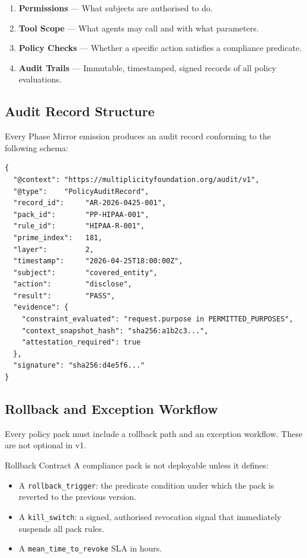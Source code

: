 \documentclass[12pt,letterpaper]{article}
\theoremstyle{definition}
\theoremstyle{plain}
\theoremstyle{remark}
\begin{document}
\begin{enumerate}
  \item \textbf{Permissions} --- What subjects are authorised to do.
  \item \textbf{Tool Scope} --- What agents may call and with what parameters.
  \item \textbf{Policy Checks} --- Whether a specific action satisfies a
  compliance predicate.
  \item \textbf{Audit Trails} --- Immutable, timestamped, signed records of all
  policy evaluations.
\end{enumerate}

\subsection{Audit Record Structure}

Every Phase Mirror emission produces an audit record conforming to the following
schema:

\begin{lstlisting}[style=jsonStyle, caption={Audit record structure (JSON-LD)}]
{
  "@context": "https://multiplicityfoundation.org/audit/v1",
  "@type":    "PolicyAuditRecord",
  "record_id":     "AR-2026-0425-001",
  "pack_id":       "PP-HIPAA-001",
  "rule_id":       "HIPAA-R-001",
  "prime_index":   181,
  "layer":         2,
  "timestamp":     "2026-04-25T18:00:00Z",
  "subject":       "covered_entity",
  "action":        "disclose",
  "result":        "PASS",
  "evidence": {
    "constraint_evaluated": "request.purpose in PERMITTED_PURPOSES",
    "context_snapshot_hash": "sha256:a1b2c3...",
    "attestation_required": true
  },
  "signature": "sha256:d4e5f6..."
}
\end{lstlisting}

\subsection{Rollback and Exception Workflow}

Every policy pack must include a rollback path and an exception workflow. These
are not optional in v1.

\begin{policybox}{Rollback Contract}
A compliance pack is not deployable unless it defines:
\begin{itemize}
  \item A \texttt{rollback\_trigger}: the predicate condition under which the
  pack is reverted to the previous version.
  \item A \texttt{kill\_switch}: a signed, authorised revocation signal that
  immediately suspends all pack rules.
  \item A \texttt{mean\_time\_to\_revoke} SLA in hours.
\end{itemize}
\end{policybox}
\end{document}
